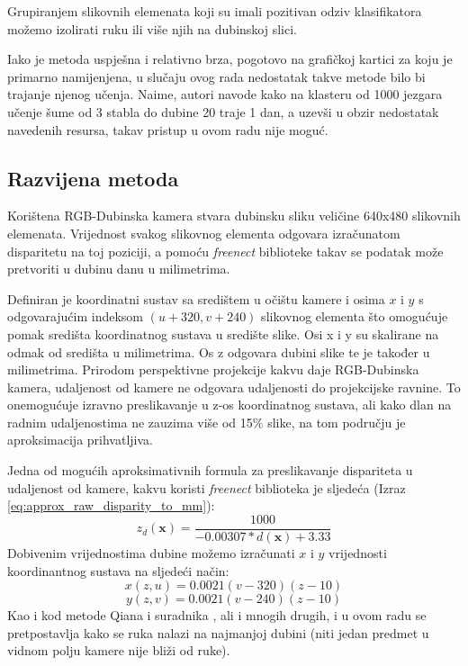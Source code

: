 \documentclass[times, utf8, diplomski, numeric]{fer}
\begin{document}
Grupiranjem slikovnih elemenata koji su imali pozitivan odziv klasifikatora možemo izolirati ruku ili više njih na dubinskoj slici.

Iako je metoda uspješna i relativno brza, pogotovo na grafičkoj kartici za koju je primarno namijenjena, u slučaju ovog rada nedostatak takve metode bilo bi trajanje njenog učenja. Naime, autori navode kako na klasteru od 1000 jezgara učenje šume od 3 stabla do dubine 20 traje 1 dan, a uzevši u obzir nedostatak navedenih resursa, takav pristup u ovom radu nije moguć.

\subsection{Razvijena metoda}

Korištena RGB-Dubinska kamera stvara dubinsku sliku veličine 640x480 slikovnih elemenata. Vrijednost svakog slikovnog elementa odgovara izračunatom disparitetu na toj poziciji, a pomoću \textit{freenect} biblioteke takav se podatak može pretvoriti u dubinu danu u milimetrima.

Definiran je koordinatni sustav sa središtem u očištu kamere i osima $x$ i $y$ s odgovarajućim indeksom $(u+320,v+240)$ slikovnog elementa što omogućuje pomak središta koordinatnog sustava u središte slike. Osi x i y su skalirane na odmak od središta u milimetrima. Os z odgovara dubini slike te je također u milimetrima. Prirodom perspektivne projekcije kakvu daje RGB-Dubinska kamera, udaljenost od kamere ne odgovara udaljenosti do projekcijske ravnine. To onemogućuje izravno preslikavanje u z-os koordinatnog sustava, ali kako dlan na radnim udaljenostima ne zauzima više od 15\% slike, na tom području je aproksimacija prihvatljiva.

Jedna od mogućih aproksimativnih formula za preslikavanje dispariteta u udaljenost od kamere, kakvu koristi \textit{freenect} biblioteka \cite{openkinect} je sljedeća (Izraz \ref{eq:approx_raw_disparity_to_mm}):
\begin{equation}
	\label{eq:approx_raw_disparity_to_mm}
	z_{d}(\mathbf{x})=\frac{1000}{-0.00307*d(\mathbf{x})+3.33}
\end{equation}
Dobivenim vrijednostima dubine možemo izračunati $x$ i $y$ vrijednosti koordinantnog sustava na sljedeći način:
\begin{equation}
	\label{eq:raw_disparity_to_mm_x}
	    x(z,u)=0.0021(v - 320)(z-10) 
\end{equation}
\begin{equation}
	\label{eq:raw_disparity_to_mm_y}
	    y(z,v)=0.0021(v - 240)(z-10)
\end{equation}
Kao i kod metode Qiana i suradnika \cite{qian2014realtime}, ali i mnogih drugih, i u ovom radu se pretpostavlja kako se ruka nalazi na najmanjoj dubini (niti jedan predmet u vidnom polju kamere nije bliži od ruke).
\end{document}
